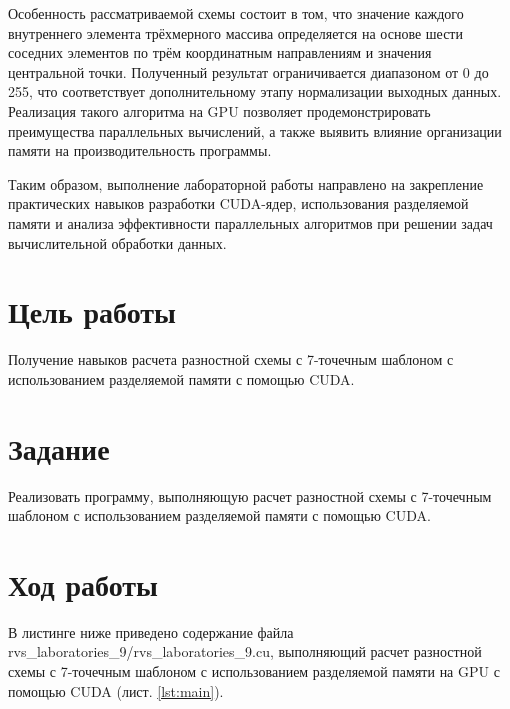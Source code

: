 \documentclass[14pt]{extarticle}
\makeatletter
\newcommand{\numbersections}{\renewcommand{\Hy@numberline}[1]{##1~}}
\let\oldsection\section
\renewcommand{\section}{\numbersections\oldsection}
\makeatother
\begin{document}
Особенность рассматриваемой схемы состоит в том, что значение каждого внутреннего элемента трёхмерного массива определяется на основе шести соседних элементов по трём координатным направлениям и значения центральной точки. Полученный результат ограничивается диапазоном от 0 до 255, что соответствует дополнительному этапу нормализации выходных данных. Реализация такого алгоритма на GPU позволяет продемонстрировать преимущества параллельных вычислений, а также выявить влияние организации памяти на производительность программы.

Таким образом, выполнение лабораторной работы направлено на закрепление практических навыков разработки CUDA-ядер, использования разделяемой памяти и анализа эффективности параллельных алгоритмов при решении задач вычислительной обработки данных.

\section{Цель работы}

Получение навыков расчета разностной схемы с 7-точечным шаблоном с использованием разделяемой памяти с помощью CUDA.

\section{Задание}

Реализовать программу, выполняющую расчет разностной схемы с 7-точечным шаблоном с использованием разделяемой памяти с помощью CUDA.

\section{Ход работы}

В листинге ниже приведено содержание файла rvs\_laboratories\_9/rvs\_\-lab\-or\-at\-ories\_\-9.cu, выполняющий расчет разностной схемы с 7-точечным шаблоном с использованием разделяемой памяти на GPU с помощью CUDA (лист. \ref{lst:main}).
\end{document}
